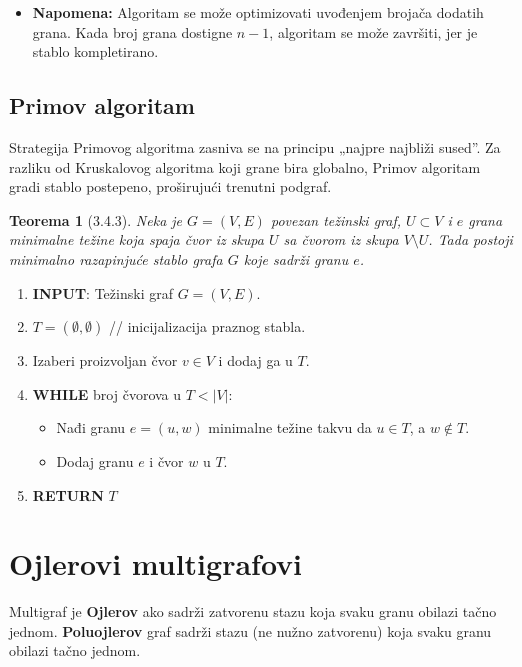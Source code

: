 \documentclass[a4paper,12pt,twoside]{report}
\newtheorem{theorem}{Teorema}[section]
\numberwithin{algorithm}{section}
\begin{document}
\begin{itemize}
    \item \textbf{Napomena:} Algoritam se može optimizovati uvođenjem brojača dodatih grana. Kada broj grana dostigne $n-1$, algoritam se može završiti, jer je stablo kompletirano.
\end{itemize}

\subsection{Primov algoritam}
Strategija Primovog algoritma zasniva se na principu „najpre najbliži sused”. Za razliku od Kruskalovog algoritma koji grane bira globalno, Primov algoritam gradi stablo postepeno, proširujući trenutni podgraf.

\begin{theorem}[3.4.3]
    Neka je $G = (V, E)$ povezan težinski graf, $U \subset V$ i $e$ grana minimalne težine koja spaja čvor iz skupa $U$ sa čvorom iz skupa $V \setminus U$. Tada postoji minimalno razapinjuće stablo grafa $G$ koje sadrži granu $e$.
\end{theorem}

\begin{algorithm}[ht]
    \caption{Primov algoritam}
    \begin{enumerate}
        \item \textbf{INPUT}: Težinski graf $G = (V, E)$.
        \item $T = (\emptyset, \emptyset)$ // inicijalizacija praznog stabla.
        \item Izaberi proizvoljan čvor $v \in V$ i dodaj ga u $T$.
        \item \textbf{WHILE} broj čvorova u $T < |V|$:
        \begin{itemize}
            \item Nađi granu $e = (u, w)$ minimalne težine takvu da $u \in T$, a $w \notin T$.
            \item Dodaj granu $e$ i čvor $w$ u $T$.
        \end{itemize}
        \item \textbf{RETURN} $T$
    \end{enumerate}
\end{algorithm}

\section{Ojlerovi multigrafovi}
Multigraf je \textbf{Ojlerov} ako sadrži zatvorenu stazu koja svaku granu obilazi tačno jednom. \textbf{Poluojlerov} graf sadrži stazu (ne nužno zatvorenu) koja svaku granu obilazi tačno jednom.
\end{document}
